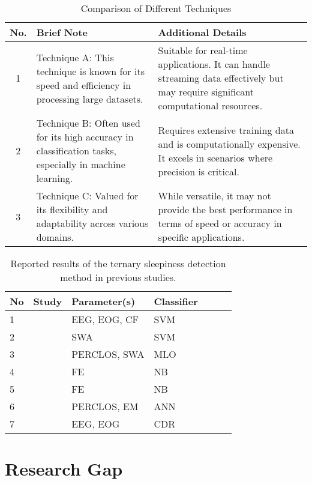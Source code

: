 \begin{table}[h]
\centering
\caption{Comparison of Different Techniques}
\label{tab:technique_comparison}
\begin{tabular}{|c|m{6cm}|m{6cm}|}
\hline
\textbf{No.} & \textbf{Brief Note} & \textbf{Additional Details} \\ \hline
1 & Technique A: This technique is known for its speed and efficiency in processing large datasets. & Suitable for real-time applications. It can handle streaming data effectively but may require significant computational resources. \\ \hline
2 & Technique B: Often used for its high accuracy in classification tasks, especially in machine learning. & Requires extensive training data and is computationally expensive. It excels in scenarios where precision is critical. \\ \hline
3 & Technique C: Valued for its flexibility and adaptability across various domains. & While versatile, it may not provide the best performance in terms of speed or accuracy in specific applications. \\ \hline
\end{tabular}
\end{table}



\begin{table}[]
	\centering
	\caption{Reported results of the ternary sleepiness detection method in previous studies. }
	\label{tab:table3levelCompareOtherMinimal}
	\begin{tabular}{lllllll}
		\toprule[\heavyrulewidth] \toprule[\heavyrulewidth]
		No& Study   & Parameter(s) & Classifier   \\
		\midrule[\heavyrulewidth]
		1&\cite{Barua_2019} & 	EEG, EOG, CF& SVM \\
		2&\cite{Chai2019} & SWA & SVM \\
		3&\cite{Wang2016} & PERCLOS, SWA & 	MLO\\
		4&\cite{Zhao2015} & FE & NB \\
		5&\cite{Zhao2018} & FE & NB \\
		6&\cite{Zilin2017} & PERCLOS, EM & 	ANN\\
		7&\cite{Picot_2012} & 		EEG, EOG & 		CDR \\
		\hline	
	\end{tabular}
\end{table}

\section{Research Gap}

